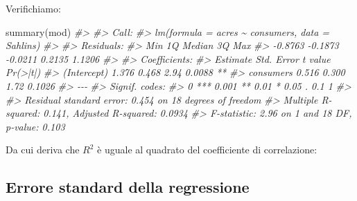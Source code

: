 \documentclass[
  11pt,
]{krantz}
\makeatletter
\newenvironment{Shaded}{\begin{snugshade}}{\end{snugshade}}
\newcommand{\CommentTok}[1]{\textcolor[rgb]{0.37,0.37,0.37}{\textit{#1}}}
\newcommand{\DecValTok}[1]{\textcolor[rgb]{0.06,0.06,0.06}{#1}}
\newcommand{\FunctionTok}[1]{\textcolor[rgb]{0,0,0}{#1}}
\newcommand{\NormalTok}[1]{#1}
\newcommand{\SpecialCharTok}[1]{\textcolor[rgb]{0,0,0}{#1}}
\newenvironment{kframe}{%
\medskip{}
\setlength{\fboxsep}{.8em}
 \def\at@end@of@kframe{}%
 \ifinner\ifhmode%
  \def\at@end@of@kframe{\end{minipage}}%
  \begin{minipage}{\columnwidth}%
 \fi\fi%
 \def\FrameCommand##1{\hskip\@totalleftmargin \hskip-\fboxsep
 \colorbox{shadecolor}{##1}\hskip-\fboxsep
     \hskip-\linewidth \hskip-\@totalleftmargin \hskip\columnwidth}%
 \MakeFramed {\advance\hsize-\width
   \@totalleftmargin\z@ \linewidth\hsize
   \@setminipage}}%
 {\par\unskip\endMakeFramed%
 \at@end@of@kframe}
\renewenvironment{Shaded}{\begin{kframe}}{\end{kframe}}
\theoremstyle{definition}
\theoremstyle{definition}
\theoremstyle{definition}
\theoremstyle{definition}
\theoremstyle{remark}
\makeatother
\begin{document}
Verifichiamo:

\begin{Shaded}
\begin{Highlighting}[]
\FunctionTok{summary}\NormalTok{(mod)}
\CommentTok{\#\textgreater{} }
\CommentTok{\#\textgreater{} Call:}
\CommentTok{\#\textgreater{} lm(formula = acres \textasciitilde{} consumers, data = Sahlins)}
\CommentTok{\#\textgreater{} }
\CommentTok{\#\textgreater{} Residuals:}
\CommentTok{\#\textgreater{}     Min      1Q  Median      3Q     Max }
\CommentTok{\#\textgreater{} {-}0.8763 {-}0.1873 {-}0.0211  0.2135  1.1206 }
\CommentTok{\#\textgreater{} }
\CommentTok{\#\textgreater{} Coefficients:}
\CommentTok{\#\textgreater{}             Estimate Std. Error t value Pr(\textgreater{}|t|)   }
\CommentTok{\#\textgreater{} (Intercept)    1.376      0.468    2.94   0.0088 **}
\CommentTok{\#\textgreater{} consumers      0.516      0.300    1.72   0.1026   }
\CommentTok{\#\textgreater{} {-}{-}{-}}
\CommentTok{\#\textgreater{} Signif. codes:  }
\CommentTok{\#\textgreater{} 0 \textquotesingle{}***\textquotesingle{} 0.001 \textquotesingle{}**\textquotesingle{} 0.01 \textquotesingle{}*\textquotesingle{} 0.05 \textquotesingle{}.\textquotesingle{} 0.1 \textquotesingle{} \textquotesingle{} 1}
\CommentTok{\#\textgreater{} }
\CommentTok{\#\textgreater{} Residual standard error: 0.454 on 18 degrees of freedom}
\CommentTok{\#\textgreater{} Multiple R{-}squared:  0.141,  Adjusted R{-}squared:  0.0934 }
\CommentTok{\#\textgreater{} F{-}statistic: 2.96 on 1 and 18 DF,  p{-}value: 0.103}
\end{Highlighting}
\end{Shaded}

Da cui deriva che \(R^2\) è uguale al quadrato del coefficiente di correlazione:

\begin{Shaded}
\end{Shaded}

\hypertarget{errore-standard-della-regressione}{%
\subsection{Errore standard della regressione}\label{errore-standard-della-regressione}}
\end{document}
